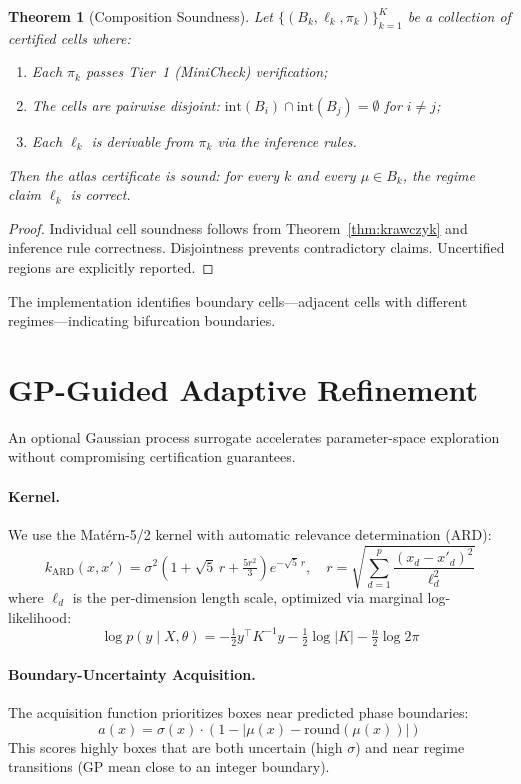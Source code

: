 \documentclass[11pt]{article}
\newtheorem{theorem}{Theorem}
\begin{document}
\begin{theorem}[Composition Soundness]
\label{thm:composition}
Let $\{(B_k, \ell_k, \pi_k)\}_{k=1}^K$ be a collection of certified cells where:
\begin{enumerate}
\item Each $\pi_k$ passes Tier~1 (MiniCheck) verification;
\item The cells are pairwise disjoint: $\mathrm{int}(B_i) \cap \mathrm{int}(B_j) = \emptyset$ for $i \neq j$;
\item Each $\ell_k$ is derivable from $\pi_k$ via the inference rules.
\end{enumerate}
Then the atlas certificate is sound: for every $k$ and every $\mu \in B_k$, the regime claim $\ell_k$ is correct.
\end{theorem}

\begin{proof}
Individual cell soundness follows from Theorem~\ref{thm:krawczyk} and inference rule correctness.
Disjointness prevents contradictory claims.
Uncertified regions are explicitly reported.
\end{proof}

The implementation identifies boundary cells---adjacent cells with different regimes---indicating bifurcation boundaries.

\section{GP-Guided Adaptive Refinement}
\label{sec:gp}

An optional Gaussian process surrogate accelerates parameter-space exploration without compromising certification guarantees.

\paragraph{Kernel.}
We use the Mat\'ern-5/2 kernel with automatic relevance determination (ARD):
\[
k_{\mathrm{ARD}}(x, x') = \sigma^2 \!\left(1 + \sqrt{5}\,r + \tfrac{5r^2}{3}\right) e^{-\sqrt{5}\,r}, \quad r = \sqrt{\textstyle\sum_{d=1}^p \frac{(x_d - x'_d)^2}{\ell_d^2}}
\]
where $\ell_d$ is the per-dimension length scale, optimized via marginal log-likelihood:
\[
\log p(y \mid X, \theta) = -\tfrac{1}{2} y^\top K^{-1} y - \tfrac{1}{2} \log |K| - \tfrac{n}{2} \log 2\pi
\]

\paragraph{Boundary-Uncertainty Acquisition.}
The acquisition function prioritizes boxes near predicted phase boundaries:
\[
a(x) = \sigma(x) \cdot (1 - |\mu(x) - \mathrm{round}(\mu(x))|)
\]
This scores highly boxes that are both uncertain (high $\sigma$) and near regime transitions (GP mean close to an integer boundary).
\end{document}
